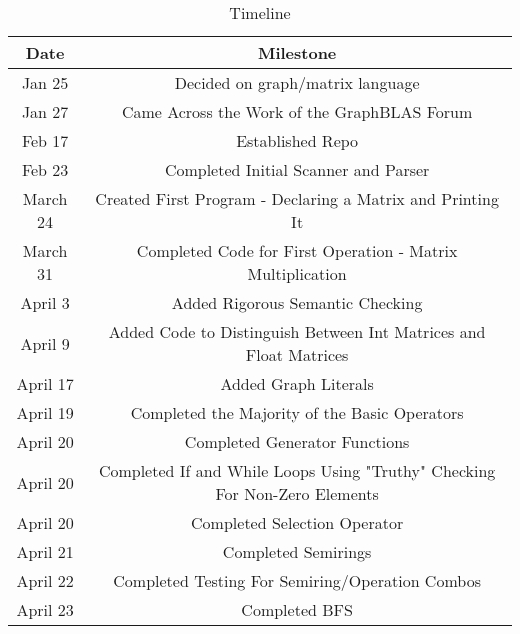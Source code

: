 \begin{table}[]
    \centering
    \caption{Timeline}
    \begin{tabular}{|c|c|}
    	\hline
         Date & Milestone \\\hline
         Jan 25 & Decided on graph/matrix language \\
         Jan 27 & Came Across the Work of the GraphBLAS Forum\\
         Feb 17 & Established Repo \\
         Feb 23 & Completed Initial Scanner and Parser\\
         March 24 & Created First Program - Declaring a Matrix and Printing It\\
         March 31 & Completed Code for First Operation - Matrix Multiplication\\
         April 3 & Added Rigorous Semantic Checking \\
         April 9 & Added Code to Distinguish Between Int Matrices and Float Matrices\\
         April 17 & Added Graph Literals\\
         April 19 & Completed the Majority of the Basic Operators\\
         April 20 & Completed Generator Functions\\
         April 20 & Completed If and While Loops Using "Truthy" Checking For Non-Zero Elements\\
         April 20 & Completed Selection Operator\\
         April 21 & Completed Semirings\\
         April 22 & Completed Testing For Semiring/Operation Combos\\
         April 23 & Completed BFS\\\hline
    \end{tabular}
\end{table}
